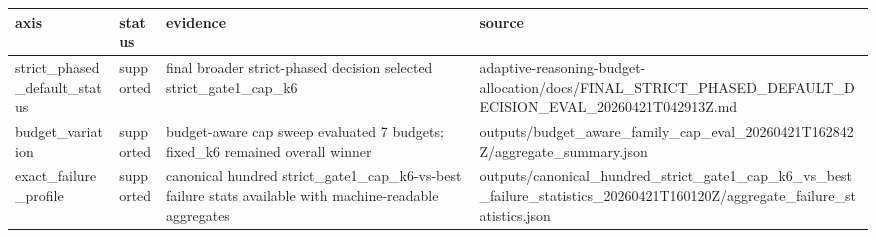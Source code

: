 \begin{tabular}{llll}
\hline
axis & status & evidence & source \\
\hline
strict\_phased\_default\_status & supported & final broader strict-phased decision selected strict\_gate1\_cap\_k6 & adaptive-reasoning-budget-allocation/docs/FINAL\_STRICT\_PHASED\_DEFAULT\_DECISION\_EVAL\_20260421T042913Z.md \\
budget\_variation & supported & budget-aware cap sweep evaluated 7 budgets; fixed\_k6 remained overall winner & outputs/budget\_aware\_family\_cap\_eval\_20260421T162842Z/aggregate\_summary.json \\
exact\_failure\_profile & supported & canonical hundred strict\_gate1\_cap\_k6-vs-best failure stats available with machine-readable aggregates & outputs/canonical\_hundred\_strict\_gate1\_cap\_k6\_vs\_best\_failure\_statistics\_20260421T160120Z/aggregate\_failure\_statistics.json \\
\hline
\end{tabular}
